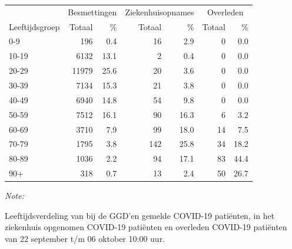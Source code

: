 \documentclass[
  english,
  man,floatsintext]{apa6}
\begin{document}
\begin{table}[H]
\centering\begingroup\fontsize{11}{13}\selectfont

\begin{threeparttable}
\begin{tabular}{lrrrrrr}
\toprule
\multicolumn{1}{c}{ } & \multicolumn{2}{c}{Besmettingen} & \multicolumn{2}{c}{Ziekenhuisopnames} & \multicolumn{2}{c}{Overleden} \\
\cmidrule(l{3pt}r{3pt}){2-3} \cmidrule(l{3pt}r{3pt}){4-5} \cmidrule(l{3pt}r{3pt}){6-7}
Leeftijdsgroep & Totaal & \% & Totaal & \% & Totaal & \%\\
\midrule
0-9 & 196 & 0.4 & 16 & 2.9 & 0 & 0.0\\
10-19 & 6132 & 13.1 & 2 & 0.4 & 0 & 0.0\\
20-29 & 11979 & 25.6 & 20 & 3.6 & 0 & 0.0\\
30-39 & 7134 & 15.3 & 21 & 3.8 & 0 & 0.0\\
40-49 & 6940 & 14.8 & 54 & 9.8 & 0 & 0.0\\
50-59 & 7512 & 16.1 & 90 & 16.3 & 6 & 3.2\\
60-69 & 3710 & 7.9 & 99 & 18.0 & 14 & 7.5\\
70-79 & 1795 & 3.8 & 142 & 25.8 & 34 & 18.2\\
80-89 & 1036 & 2.2 & 94 & 17.1 & 83 & 44.4\\
90+ & 318 & 0.7 & 13 & 2.4 & 50 & 26.7\\
\bottomrule
\end{tabular}
\begin{tablenotes}
\item \textit{Note: } 
\item Leeftijdsverdeling van bij de GGD’en gemelde COVID-19 patiënten, in het ziekenhuis opgenomen COVID-19 patiënten en overleden COVID-19 patiënten van 22 september t/m 06 oktober 10:00 uur.
\end{tablenotes}
\end{threeparttable}
\endgroup{}
\end{table}
\end{document}
